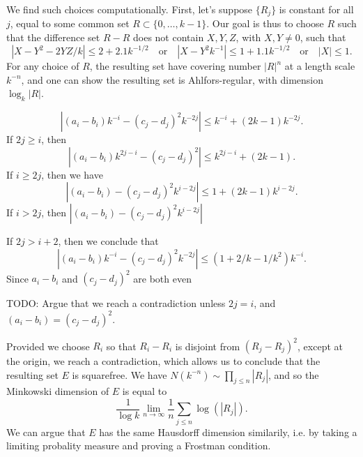 \documentclass[dvipsnames,letterpaper,12pt]{article}
\numberwithin{equation}{section}
\numberwithin{theorem}{section}
\begin{document}
We find such choices computationally. First, let's suppose $\{ R_j \}$ is constant for all $j$, equal to some common set $R \subset \{ 0, \dots, k - 1 \}$. Our goal is thus to choose $R$ such that the difference set $R - R$ does not contain $X,Y,Z$, with $X,Y \neq 0$, such that
%
\[ |X - Y^2 - 2YZ/k| \leq 2 + 2.1k^{-1/2} \quad\text{or}\quad |X - Y^2 k^{-1}| \leq 1 + 1.1 k^{-1/2}\quad\text{or}\quad |X| \leq 1. \]
%
For any choice of $R$, the resulting set have covering number $|R|^n$ at a length scale $k^{-n}$, and one can show the resulting set is Ahlfors-regular, with dimension $\log_k|R|$.


\newpage


%
\[ |(a_i - b_i) k^{-i} - (c_j - d_j)^2 k^{-2j}| \leq k^{-i} + (2k-1) k^{-2j}. \]
%
If $2j \geq i$, then
%
\[ |(a_i - b_i) k^{2j - i} - (c_j - d_j)^2| \leq k^{2j-i} + (2k-1). \]
%
If $i \geq 2j$, then we have
%
\[ |(a_i - b_i) - (c_j - d_j)^2 k^{i-2j}| \leq 1 + (2k-1) k^{i-2j}. \]
%
If $i > 2j$, then $|(a_i - b_i) - (c_j - d_j)^2 k^{i-2j}|$


If $2j > i + 2$, then we conclude that
%
\[ |(a_i - b_i) k^{-i} - (c_j - d_j)^2 k^{-2j}| \leq (1 + 2/k - 1/k^2) k^{-i}. \]
%
Since $a_i - b_i$ and $(c_j - d_j)^2$ are both even

TODO: Argue that we reach a contradiction unless $2j = i$, and $(a_i - b_i) = (c_j - d_j)^2$.

Provided we choose $R_i$ so that $R_i - R_i$ is disjoint from $(R_j - R_j)^2$, except at the origin, we reach a contradiction, which allows us to conclude that the resulting set $E$ is squarefree. We have $N(k^{-n}) \sim \prod_{j \leq n} |R_j|$, and so the Minkowski dimension of $E$ is equal to
%
\[ \frac{1}{\log k} \lim_{n \to \infty} \frac{1}{n} \sum_{j \leq n} \log(|R_j|). \]
We can argue that $E$ has the same Hausdorff dimension similarily, i.e. by taking a limiting probality measure and proving a Frostman condition.
\end{document}
